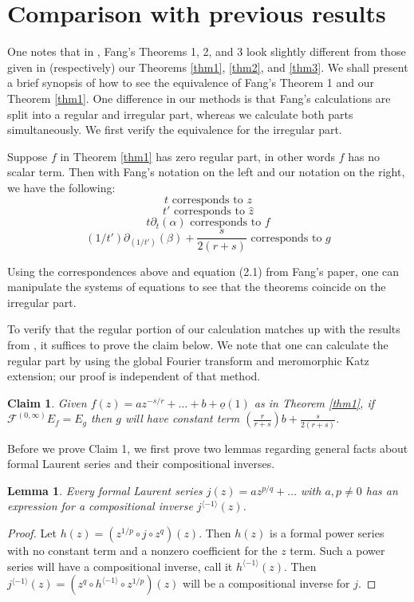 \documentclass[11pt]{amsart}
\theoremstyle{theorem}
\theoremstyle{lemma}
\newtheorem{lemma}{Lemma}
\newtheorem{claim}{Claim}
\theoremstyle{corollary}
\theoremstyle{proposition}
\theoremstyle{definition}
\theoremstyle{remark}
\def\d{\displaystyle}
\begin{document}
\section{Comparison with previous results}

One notes that in \cite{fang}, Fang's Theorems 1, 2, and 3 look slightly different from those given in (respectively) our Theorems \ref{thm1}, \ref{thm2}, and \ref{thm3}.  We shall present a brief synopsis of how to see the equivalence of Fang's Theorem 1 and our Theorem \ref{thm1}.  One difference in our methods is that Fang's calculations are split into a regular and irregular part, whereas we calculate both parts simultaneously.  We first verify the equivalence for the irregular part.

Suppose $f$ in Theorem \ref{thm1} has zero regular part, in other words $f$ has no scalar term.  Then with Fang's notation on the left and our notation on the right, we have the following:
\[ t \text{  corresponds to  } z\]
\[ t' \text{  corresponds to  } \hat{z}\]
\[ t\partial_t(\alpha) \text{  corresponds to  } f\]
\[ (1/t')\partial_{(1/t')}(\beta)+\frac{s}{2(r+s)} \text{  corresponds to  } g\]

Using the correspondences above and equation (2.1) from Fang's paper, one can manipulate the systems of equations to see that the theorems coincide on the irregular part.

 To verify that the regular portion of our calculation matches up with the results from \cite{fang}, it suffices to prove the claim below.  We note that one can calculate the regular part by using the global Fourier transform and meromorphic Katz extension; our proof is independent of that method.

\begin{claim}\label{claim}
	Given $f(z)=az^{-s/r}+\dots+b+\underline{o}(1)$ as in Theorem \ref{thm1}, if $\mathcal{F}^{(0, \infty)}E_f = E_g$ then $g$ will have constant term $\d{\left(\frac{r}{r+s}\right)b+\frac{s}{2(r+s)}}$.
\end{claim}
Before we prove Claim 1, we first prove two lemmas regarding general facts about formal Laurent series and their compositional inverses.

\begin{lemma}\label{Laurinv}
	Every formal Laurent series $j(z)=az^{p/q}+\dots$ with $a, p \neq0$ has an expression for a compositional inverse $j^{\langle -1 \rangle}(z)$.
\end{lemma}

\begin{proof}
	Let  $h(z) = (z^{1/p}\circ j\circ z^q)(z)$.  Then $h(z)$ is a formal power series with no constant term and a nonzero coefficient for the $z$ term.  Such a power series will have a compositional inverse, call it $h^{\langle -1 \rangle}(z)$.  Then $j^{\langle -1 \rangle}(z)=(z^q\circ h^{\langle -1 \rangle}\circ z^{1/p})(z)$ will be a compositional inverse for $j$.
\end{proof}
\end{document}
